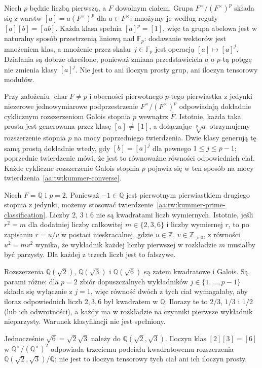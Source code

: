 \begin{uwaga}\label{aa:uw:kummer-products}
Niech $p$ będzie liczbą pierwszą, a $F$ dowolnym ciałem.
Grupa $F^\times/(F^\times)^p$ składa się z warstw
$[a]=a(F^\times)^p$ dla $a\in F^\times$;
mnożymy je według reguły $[a][b]=[ab]$.
Każda klasa spełnia $[a]^p=[1]$, więc ta grupa abelowa
jest w naturalny sposób przestrzenią liniową nad $\mathbb F_p$:
dodawanie wektorów jest mnożeniem klas, a mnożenie
przez skalar $j\in\mathbb F_p$ jest operacją
$[a]\mapsto[a]^j$. Działania są dobrze określone,
ponieważ zmiana przedstawiciela $a$ o $p$-tą potęgę
nie zmienia klasy $[a]^j$.
Nie jest to ani iloczyn prosty grup, ani iloczyn tensorowy modułów.

Przy założeniu $\operatorname{char}F\neq p$ i obecności
pierwotnego $p$-tego pierwiastka z jedynki
niezerowe jednowymiarowe podprzestrzenie
$F^\times/(F^\times)^p$ odpowiadają dokładnie cyklicznym
rozszerzeniom Galois stopnia $p$ wewnątrz $\overline F$.
Istotnie, każda taka prosta jest generowana przez klasę
$[a]\neq[1]$, a dołączając $\sqrt[p]{a}$ otrzymujemy
rozszerzenie stopnia $p$ na mocy poprzedniego twierdzenia.
Dwie klasy generują tę samą prostą dokładnie wtedy,
gdy $[b]=[a]^j$ dla pewnego $1\leq j\leq p-1$;
poprzednie twierdzenie mówi, że jest to równoważne
równości odpowiednich ciał. Każde cykliczne rozszerzenie
Galois stopnia $p$ pojawia się w ten sposób na mocy
twierdzenia~\ref{aa:tw:kummer-converse}.
\end{uwaga}

\begin{przyklad}\label{aa:prz:kummer-three-quadratic}
Niech $F=\mathbb Q$ i $p=2$. Ponieważ $-1\in\mathbb Q$
jest pierwotnym pierwiastkiem drugiego stopnia z jedynki,
możemy stosować twierdzenie~\ref{aa:tw:kummer-prime-classification}.
Liczby $2$, $3$ i $6$ nie są kwadratami liczb wymiernych.
Istotnie, jeśli $r^2=m$ dla dodatniej liczby całkowitej
$m\in\{2,3,6\}$ i liczby wymiernej $r$, to po zapisaniu
$r=u/v$ w postaci nieskracalnej, gdzie $u\in\mathbb Z$,
$v\in\mathbb Z_{>0}$, z równości $u^2=mv^2$ wynika,
że wykładnik każdej liczby pierwszej w rozkładzie $m$
musiałby być parzysty. Dla każdej z trzech liczb jest
to fałszywe.

Rozszerzenia $\mathbb Q(\sqrt2)$, $\mathbb Q(\sqrt3)$
i $\mathbb Q(\sqrt6)$ są zatem kwadratowe i Galois.
Są parami różne: dla $p=2$ zbiór dopuszczalnych wykładników
$j\in\{1,\ldots,p-1\}$ składa się wyłącznie z $j=1$,
więc równość dwóch z tych ciał wymagałaby, aby iloraz
odpowiednich liczb $2,3,6$ był kwadratem w $\mathbb Q$.
Ilorazy te to $2/3$, $1/3$ i $1/2$ (lub ich odwrotności),
a każdy ma w rozkładzie na czynniki pierwsze wykładnik
nieparzysty. Warunek klasyfikacji nie jest spełniony.

Jednocześnie $\sqrt6=\sqrt2\sqrt3$ należy do
$\mathbb Q(\sqrt2,\sqrt3)$. Iloczyn klas $[2][3]=[6]$
w $\mathbb Q^\times/(\mathbb Q^\times)^2$ odpowiada
trzeciemu podciału kwadratowemu rozszerzenia
$\mathbb Q(\sqrt2,\sqrt3)/\mathbb Q$; nie jest to
iloczyn tensorowy tych ciał ani ich iloczyn prosty.
\end{przyklad}

